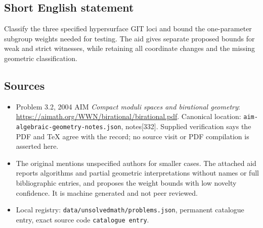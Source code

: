 \documentclass[11pt]{article}
\begin{document}
\subsection{Short English statement}
Classify the three specified hypersurface GIT loci and bound the one-parameter subgroup weights needed for testing. The aid gives separate proposed bounds for weak and strict witnesses, while retaining all coordinate changes and the missing geometric classification.
\subsection{Sources}
\begin{itemize}
\item Problem 3.2, 2004 AIM \emph{Compact moduli spaces and birational geometry}: \url{https://aimath.org/WWN/birational/birational.pdf}. Canonical location: \texttt{aim-algebraic-geometry-notes.json}, notes[332]. Supplied verification says the PDF and TeX agree with the record; no source visit or PDF compilation is asserted here.
\item The original mentions unspecified authors for smaller cases. The attached aid reports algorithms and partial geometric interpretations without names or full bibliographic entries, and proposes the weight bounds with low novelty confidence. It is machine generated and not peer reviewed.
\item Local registry: \texttt{data/unsolvedmath/problems.json}, permanent catalogue entry, exact source code \texttt{catalogue entry}.
\end{itemize}
\end{document}
